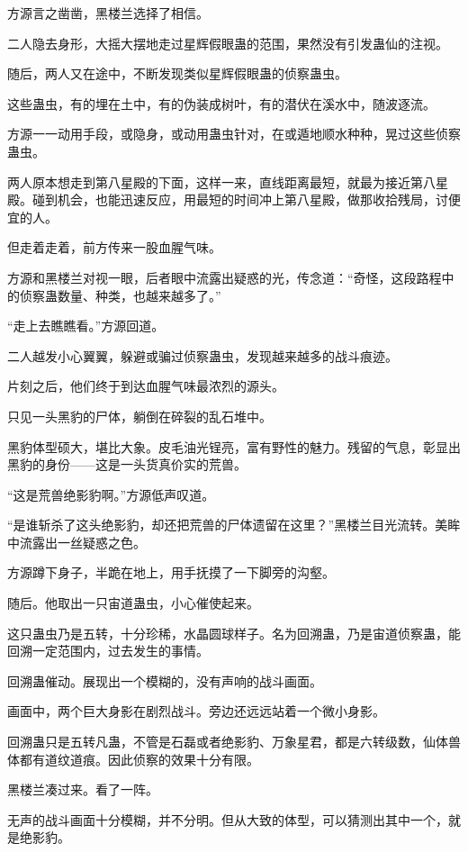 
\begin{this_body}

方源言之凿凿，黑楼兰选择了相信。

二人隐去身形，大摇大摆地走过星辉假眼蛊的范围，果然没有引发蛊仙的注视。

随后，两人又在途中，不断发现类似星辉假眼蛊的侦察蛊虫。

这些蛊虫，有的埋在土中，有的伪装成树叶，有的潜伏在溪水中，随波逐流。

方源一一动用手段，或隐身，或动用蛊虫针对，在或遁地顺水种种，晃过这些侦察蛊虫。

两人原本想走到第八星殿的下面，这样一来，直线距离最短，就最为接近第八星殿。碰到机会，也能迅速反应，用最短的时间冲上第八星殿，做那收拾残局，讨便宜的人。

但走着走着，前方传来一股血腥气味。

方源和黑楼兰对视一眼，后者眼中流露出疑惑的光，传念道：“奇怪，这段路程中的侦察蛊数量、种类，也越来越多了。”

“走上去瞧瞧看。”方源回道。

二人越发小心翼翼，躲避或骗过侦察蛊虫，发现越来越多的战斗痕迹。

片刻之后，他们终于到达血腥气味最浓烈的源头。

只见一头黑豹的尸体，躺倒在碎裂的乱石堆中。

黑豹体型硕大，堪比大象。皮毛油光锃亮，富有野性的魅力。残留的气息，彰显出黑豹的身份——这是一头货真价实的荒兽。

“这是荒兽绝影豹啊。”方源低声叹道。

“是谁斩杀了这头绝影豹，却还把荒兽的尸体遗留在这里？”黑楼兰目光流转。美眸中流露出一丝疑惑之色。

方源蹲下身子，半跪在地上，用手抚摸了一下脚旁的沟壑。

随后。他取出一只宙道蛊虫，小心催使起来。

这只蛊虫乃是五转，十分珍稀，水晶圆球样子。名为回溯蛊，乃是宙道侦察蛊，能回溯一定范围内，过去发生的事情。

回溯蛊催动。展现出一个模糊的，没有声响的战斗画面。

画面中，两个巨大身影在剧烈战斗。旁边还远远站着一个微小身影。

回溯蛊只是五转凡蛊，不管是石磊或者绝影豹、万象星君，都是六转级数，仙体兽体都有道纹道痕。因此侦察的效果十分有限。

黑楼兰凑过来。看了一阵。

无声的战斗画面十分模糊，并不分明。但从大致的体型，可以猜测出其中一个，就是绝影豹。


\end{this_body}
